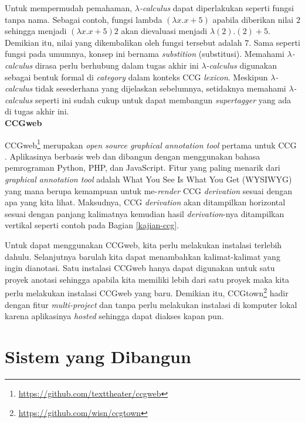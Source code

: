 Untuk mempermudah pemahaman, {$\lambda$}\textit{-calculus} dapat diperlakukan seperti fungsi tanpa
nama. Sebagai contoh, fungsi lambda $({\lambda}x. x + 5)$ apabila diberikan nilai $2$ sehingga
menjadi $({\lambda}x. x + 5) 2$ akan dievaluasi menjadi ${\lambda}(2). (2) + 5$.
Demikian itu, nilai yang dikembalikan oleh fungsi tersebut adalah $7$.
Sama seperti fungsi pada umumnya, konsep ini bernama \textit{substition} (substitusi).
Memahami {$\lambda$}\textit{-calculus} dirasa perlu berhubung dalam tugas akhir ini
{$\lambda$}\textit{-calculus} digunakan sebagai bentuk formal di \textit{category}
dalam konteks CCG \textit{lexicon}. Meskipun {$\lambda$}\textit{-calculus} tidak sesederhana
yang dijelaskan sebelumnya, setidaknya memahami {$\lambda$}\textit{-calculus} seperti ini
sudah cukup untuk dapat membangun \textit{supertagger} yang ada di tugas akhir ini.
\\


\noindent\textbf{CCGweb}

CCGweb\footnote{\url{https://github.com/texttheater/ccgweb}} merupakan
\textit{open source graphical annotation tool} pertama untuk CCG \citep{evang-etal-2019-ccgweb}.
Aplikasinya berbasis web dan dibangun dengan menggunakan bahasa pemrograman
Python, PHP, dan JavaScript.
Fitur yang paling menarik dari \textit{graphical annotation tool} adalah What You See Is What
You Get (WYSIWYG) yang mana berupa kemampuan untuk me-\textit{render} CCG \textit{derivation}
sesuai dengan apa yang kita lihat.
Maksudnya, CCG \textit{derivation} akan ditampilkan horizontal sesuai dengan panjang kalimatnya
kemudian hasil \textit{derivation}-nya ditampilkan vertikal seperti contoh pada
Bagian \ref{kajian-ccg}.

Untuk dapat menggunakan CCGweb, kita perlu melakukan instalasi terlebih dahulu.
Selanjutnya barulah kita dapat menambahkan kalimat-kalimat yang ingin dianotasi.
Satu instalasi CCGweb hanya dapat digunakan untuk satu proyek anotasi sehingga
apabila kita memiliki lebih dari satu proyek maka kita perlu melakukan instalasi
CCGweb yang baru.
Demikian itu, CCGtown\footnote{\url{https://github.com/wisn/ccgtown}} hadir dengan
fitur \textit{multi-project} dan tanpa perlu melakukan instalasi di komputer lokal
karena aplikasinya \textit{hosted} sehingga dapat diakses kapan pun.



\section{Sistem yang Dibangun}

